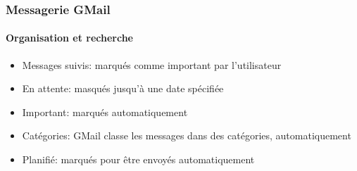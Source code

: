 \documentclass[xcolor=table]{beamer}
\begin{document}
\begin{frame}
\frametitle{Messagerie GMail}
\framesubtitle{Organisation et recherche}

\begin{minipage}{0.69\textwidth}
	\begin{itemize}
		\item Messages suivis: marqués comme important par l'utilisateur
		\item En attente: masqués jusqu'à une date spécifiée
		\item Important: marqués automatiquement 
		\item Catégories: GMail classe les messages dans des catégories, automatiquement
		\item Planifié: marqués pour être envoyés automatiquement
	\end{itemize}
\end{minipage}
\begin{minipage}{0.26\textwidth}

\end{minipage}
\end{frame}
\end{document}
